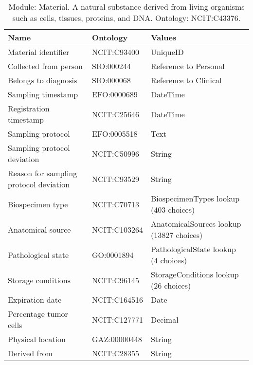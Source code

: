 \documentclass{article}
\begin{document}
\begin{table}[htb]
\begin{tabular}{lll}
Name & Ontology & Values \\
\hline
Material identifier & NCIT:C93400 & UniqueID \\
Collected from person & SIO:000244 & Reference to Personal \\
Belongs to diagnosis & SIO:000068 & Reference to Clinical \\
Sampling timestamp & EFO:0000689 & DateTime \\
Registration timestamp & NCIT:C25646 & DateTime \\
Sampling protocol & EFO:0005518 & Text \\
Sampling protocol deviation & NCIT:C50996 & String \\
Reason for sampling protocol deviation & NCIT:C93529 & String \\
Biospecimen type & NCIT:C70713 & BiospecimenTypes lookup (403 choices) \\
Anatomical source & NCIT:C103264 & AnatomicalSources lookup (13827 choices) \\
Pathological state & GO:0001894 & PathologicalState lookup (4 choices) \\
Storage conditions & NCIT:C96145 & StorageConditions lookup (26 choices) \\
Expiration date & NCIT:C164516 & Date \\
Percentage tumor cells & NCIT:C127771 & Decimal \\
Physical location & GAZ:00000448 & String \\
Derived from & NCIT:C28355 & String \\
\hline
\end{tabular}
\caption[Module: Material]{\label{table:table7} Module: Material. A natural substance derived from living organisms such as cells, tissues, proteins, and DNA. Ontology: NCIT:C43376. }
\end{table}
\end{document}
